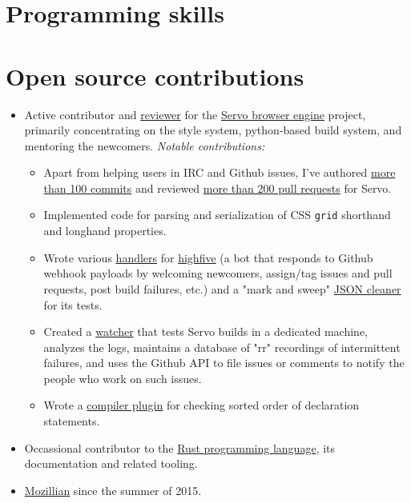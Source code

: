 \documentclass[11pt,a4paper,sans]{moderncv}        %
\newcommand\chref[3][linky]{\href{#2}{\color{#1}#3}}
\begin{document}
\section{Programming skills}

\section{Open source contributions}
\begin{itemize}
\item Active contributor and \chref{https://blog.servo.org/2016/01/11/twis-47/}{reviewer} for the \chref{https://github.com/servo/servo}{Servo browser engine} project, primarily concentrating on the style system, python-based build system, and mentoring the newcomers.
\newline
\textit{Notable contributions:}
\begin{itemize}
\item Apart from helping users in IRC and Github issues, I've authored \chref{https://github.com/servo/servo/commits?author=wafflespeanut}{more than 100 commits} and reviewed \chref{https://github.com/servo/servo/pulls?q=is:pr+assignee:wafflespeanut+is:closed}{more than 200 pull requests} for Servo.
\item Implemented code for parsing and serialization of CSS \texttt{grid} shorthand and longhand properties.
\item Wrote various \chref{https://github.com/servo/highfive/commits?author=wafflespeanut}{handlers} for \chref{https://github.com/servo/highfive}{highfive} (a bot that responds to Github webhook payloads by welcoming newcomers, assign/tag issues and pull requests, post build failures, etc.) and a "mark and sweep" \chref{https://github.com/servo/highfive/pull/115}{JSON cleaner} for its tests.
\item Created a \chref{https://github.com/servo-automation/servo-wpt}{watcher} that tests Servo builds in a dedicated machine, analyzes the logs, maintains a database of "rr" recordings of intermittent failures, and uses the Github API to file issues or comments to notify the people who work on such issues.
\item Wrote a \chref{https://github.com/wafflespeanut/rust-sorty}{compiler plugin} for checking sorted order of declaration statements.
\end{itemize}
\item Occassional contributor to the \chref{https://github.com/rust-lang/rust}{Rust programming language}, its documentation and related tooling.
\item \chref{https://mozillians.org/en-US/u/wafflespeanut}{Mozillian} since the summer of 2015.
\end{itemize}
\end{document}
